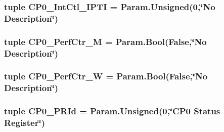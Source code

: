 \label{classMipsCPU_1_1BaseMipsCPU_a6f5844a5323d4b093567bba00d5e8185}
\hypertarget{classMipsCPU_1_1BaseMipsCPU_ac5d8901a8e6d0626eee9ac66c6ecfe44}{
\subsubsection[{CP0\_\-IntCtl\_\-IPTI}]{\setlength{\rightskip}{0pt plus 5cm}tuple {\bf CP0\_\-IntCtl\_\-IPTI} = Param.Unsigned(0,\char`\"{}No Description\char`\"{})}}
\label{classMipsCPU_1_1BaseMipsCPU_ac5d8901a8e6d0626eee9ac66c6ecfe44}
\hypertarget{classMipsCPU_1_1BaseMipsCPU_adefb92facb100633d7ad9dafa11449c8}{
\subsubsection[{CP0\_\-PerfCtr\_\-M}]{\setlength{\rightskip}{0pt plus 5cm}tuple {\bf CP0\_\-PerfCtr\_\-M} = Param.Bool(False,\char`\"{}No Description\char`\"{})}}
\label{classMipsCPU_1_1BaseMipsCPU_adefb92facb100633d7ad9dafa11449c8}
\hypertarget{classMipsCPU_1_1BaseMipsCPU_a7ba3612c0102a54df51f9a0770681041}{
\subsubsection[{CP0\_\-PerfCtr\_\-W}]{\setlength{\rightskip}{0pt plus 5cm}tuple {\bf CP0\_\-PerfCtr\_\-W} = Param.Bool(False,\char`\"{}No Description\char`\"{})}}
\label{classMipsCPU_1_1BaseMipsCPU_a7ba3612c0102a54df51f9a0770681041}
\hypertarget{classMipsCPU_1_1BaseMipsCPU_a0a4089c6aacda5dd54c80fc8584cfdd7}{
\subsubsection[{CP0\_\-PRId}]{\setlength{\rightskip}{0pt plus 5cm}tuple {\bf CP0\_\-PRId} = Param.Unsigned(0,\char`\"{}CP0 Status {\bf Register}\char`\"{})}}
